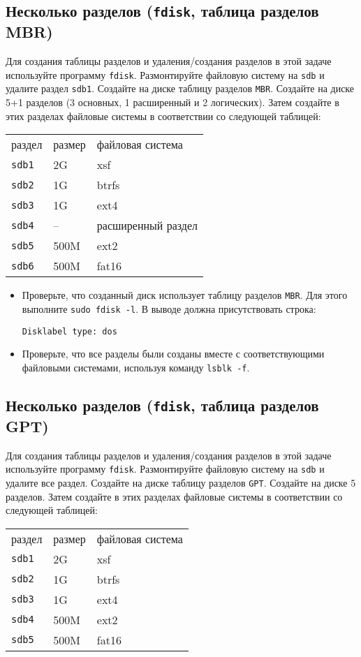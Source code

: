 \documentclass{article}
\begin{document}
\subsection{Несколько разделов (\texttt{fdisk}, таблица разделов MBR)}
Для создания таблицы разделов и удаления/создания разделов в этой задаче используйте программу \texttt{fdisk}. Размонтируйте файловую систему на \texttt{sdb} и удалите раздел \texttt{sdb1}. Создайте на диске таблицу разделов \texttt{MBR}. Создайте на диске 5+1 разделов (3 основных, 1 расширенный и 2 логических). Затем создайте в этих разделах файловые системы в соответствии со следующей таблицей:
\begin{center}
\begin{tabular}{lll}
 раздел & размер  	& файловая система   \\
 \texttt{sdb1} 	& 2G 		& xsf   \\
 \texttt{sdb2} 	& 1G 		& btrfs \\
 \texttt{sdb3} 	& 1G 		& ext4 \\
 \texttt{sdb4} 	& --	    & расширенный раздел \\
 \texttt{sdb5} 	& 500M 		& ext2 \\
 \texttt{sdb6} 	& 500M 		& fat16 \\
\end{tabular}
\end{center}

\begin{itemize}
\item Проверьте, что созданный диск использует таблицу разделов \texttt{MBR}. Для этого выполните \texttt{sudo fdisk -l}. В выводе должна присутствовать строка:
\begin{lstlisting}
Disklabel type: dos
\end{lstlisting}
\item Проверьте, что все разделы были созданы вместе с соответствующими файловыми системами, используя команду \texttt{lsblk -f}.
\end{itemize}


\subsection{Несколько разделов (\texttt{fdisk}, таблица разделов GPT)}
Для создания таблицы разделов и удаления/создания разделов в этой задаче используйте программу \texttt{fdisk}. Размонтируйте файловую систему на \texttt{sdb} и удалите все раздел. Создайте на диске таблицу разделов \texttt{GPT}. Создайте на диске 5 разделов. Затем создайте в этих разделах файловые системы в соответствии со следующей таблицей:
\begin{center}
\begin{tabular}{lll}
 раздел & размер  	& файловая система   \\
 \texttt{sdb1} 	& 2G 		& xsf   \\
 \texttt{sdb2} 	& 1G 		& btrfs \\
 \texttt{sdb3} 	& 1G 		& ext4 \\
 \texttt{sdb4} 	& 500M 		& ext2 \\
 \texttt{sdb5} 	& 500M 		& fat16 \\
\end{tabular}
\end{center}
\end{document}
